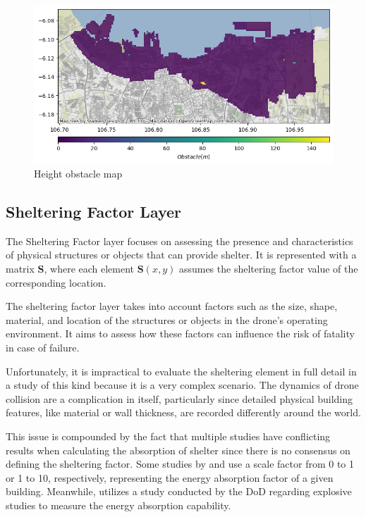 \documentclass[12pt]{report}
\begin{document}
            \begin{figure}[H]
                \centering
                \includegraphics[width=\textwidth]{Plot/obstacle.png}
                \caption{Height obstacle map}
                \label{fig:obstacle}
            \end{figure}

            \subsection{Sheltering Factor Layer}
                The Sheltering Factor layer focuses on assessing the presence and characteristics of physical structures
                or objects that can provide shelter. It is represented with a matrix \textbf{S}, where each element
                \(\mathbf{S}(x, y)\) assumes the sheltering factor value of the corresponding location.
                        
                The sheltering factor layer takes into account factors such as the size, shape, material, and location
                of the structures or objects in the drone's operating environment. It aims to assess how these factors
                can influence the risk of fatality in case of failure.
                        
                Unfortunately, it is impractical to evaluate the sheltering element in full detail in a study of this
                kind because it is a very complex scenario. The dynamics of drone collision are a complication in
                itself, particularly since detailed physical building features, like material or wall thickness, are
                recorded differently around the world.
                        
                This issue is compounded by the fact that multiple studies have conflicting results when calculating the
                absorption of shelter since there is no consensus on defining the sheltering factor. Some studies by
                \cite{dalamagkidis_evaluating_2008} and \cite{primatesta_ground_2020} use a scale factor from 0 to 1 or
                1 to 10, respectively, representing the energy absorption factor of a given building. Meanwhile,
                \cite{melnyk_third-party_2014} utilizes a study conducted by the \ac{DoD} \cite{harwick_approved_2007}
                regarding explosive studies to measure the energy absorption capability.
                        
\end{document}
